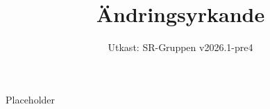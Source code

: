 \documentclass[a4paper]{dtek}
\title{Ändringsyrkande}
\date{Utkast: SR-Gruppen v2026.1-pre4}
\begin{document}
Placeholder
\end{document}

